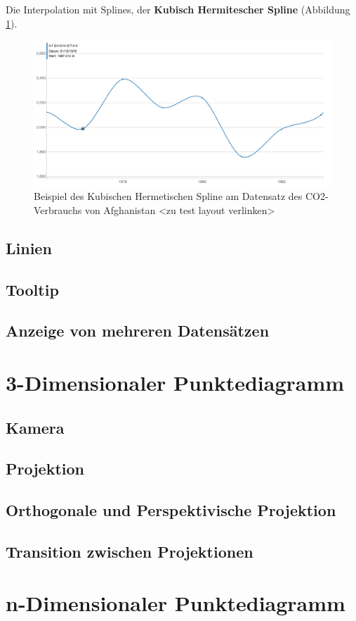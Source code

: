 Die Interpolation mit Splines, der \textbf{Kubisch Hermitescher Spline} (Abbildung \ref{fig:cardinal}).

\begin{figure}[htbp]
	\centering
	\includegraphics[width=0.80\linewidth]{images/cardinal}
	\caption[Kubischer Hermitescher Spline]{Beispiel des Kubischen Hermetischen Spline am Datensatz des CO2-Verbrauchs von Afghanistan <zu test layout verlinken>}
	\label{fig:cardinal}
\end{figure}

\subsection{Linien}
\subsection{Tooltip}
\subsection{Anzeige von mehreren Datensätzen}

\section{3-Dimensionaler Punktediagramm}

\subsection{Kamera}
\subsection{Projektion}
\subsection{Orthogonale und Perspektivische Projektion}
\subsection{Transition zwischen Projektionen}

\section{n-Dimensionaler Punktediagramm}